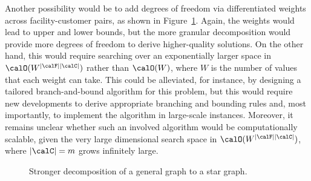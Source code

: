 \documentclass[11pt]{article}
\begin{document}
Another possibility would be to add degrees of freedom via differentiated weights across facility-customer pairs, as shown in Figure~\ref{fig:graph_decompose_granular_AE}. Again, the weights would lead to upper and lower bounds, but the more granular decomposition would provide more degrees of freedom to derive higher-quality solutions. On the other hand, this would require searching over an exponentially larger space in $\calO(W^{|\calF||\calC|})$ rather than $\calO(W)$, where $W$ is the number of values that each weight can take. This could be alleviated, for instance, by designing a tailored branch-and-bound algorithm for this problem, but this would require new developments to derive appropriate branching and bounding rules and, most importantly, to implement the algorithm in large-scale instances. Moreover, it remains unclear whether such an involved algorithm would be computationally scalable, given the very large dimensional search space in $\calO(W^{|\calF||\calC|})$, where $|\calC|=m$ grows infinitely large.

\begin{figure}[h!]
\centering
{}
\caption{Stronger decomposition of a general graph to a star graph.}\label{fig:graph_decompose_granular_AE}
\end{figure}
\end{document}

